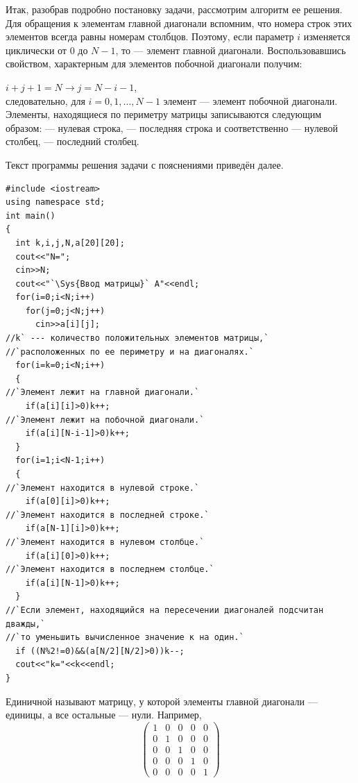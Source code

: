 Итак, разобрав подробно постановку задачи, рассмотрим алгоритм ее решения. Для обращения к элементам главной диагонали
вспомним, что номера строк этих элементов всегда равны номерам столбцов. Поэтому, если параметр $i$ изменяется
циклически от 0 до $N-1$, то  --- элемент главной диагонали. Воспользовавшись
свойством, характерным для элементов побочной диагонали получим:

$i+j+1=N \longrightarrow j=N-i-1$,\\
следовательно, для $i=0,1,\dots,N-1$ элемент  ---
элемент побочной диагонали. Элементы, находящиеся по периметру матрицы записываются 
следующим образом: 
--- нулевая строка,  --- последняя строка и соответственно  --- нулевой столбец,
 --- последний столбец.

Текст программы решения задачи с пояснениями приведён далее.
\begin{lstlisting}
#include <iostream>
using namespace std;
int main()
{
  int k,i,j,N,a[20][20]; 
  cout<<"N=";
  cin>>N;
  cout<<"`\Sys{Ввод матрицы}` A"<<endl;
  for(i=0;i<N;i++)
    for(j=0;j<N;j++)
      cin>>a[i][j];
//k` --- количество положительных элементов матрицы,` 
//`расположенных по ее периметру и на диагоналях.`
  for(i=k=0;i<N;i++)
  {
//`Элемент лежит на главной диагонали.`
    if(a[i][i]>0)k++;
//`Элемент лежит на побочной диагонали.`
    if(a[i][N-i-1]>0)k++;
  }
  for(i=1;i<N-1;i++)
  {
//`Элемент находится в нулевой строке.`
    if(a[0][i]>0)k++;
//`Элемент находится в последней строке.`
    if(a[N-1][i]>0)k++;
//`Элемент находится в нулевом столбце.`
    if(a[i][0]>0)k++;
//`Элемент находится в последнем столбце.`
    if(a[i][N-1]>0)k++;
  }
//`Если элемент, находящийся на пересечении диагоналей подсчитан дважды,`
//`то уменьшить вычисленное значение к на один.` 
  if ((N%2!=0)&&(a[N/2][N/2]>0))k--;
  cout<<"k="<<k<<endl;
}
\end{lstlisting}



Единичной называют матрицу, у которой элементы главной диагонали --- единицы, а все остальные --- нули. Например, 
$$\left(\begin{matrix}1&0&0&0&0\\0&1&0&0&0\\0&0&1&0&0\\0&0&0&1&0\\0&0&0&0&1\end{matrix}\right)$$

